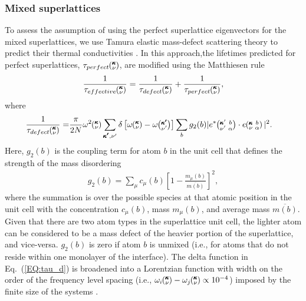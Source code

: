 \subsubsection{Mixed superlattices}
To assess the assumption of using the perfect superlattice eigenvectors for the mixed superlattices, we use Tamura elastic mass-defect scattering theory to predict their thermal conductivities \cite{tamura_isotope_1983}. In this approach,the lifetimes predicted for perfect superlattices, $\tau_{perfect}\mspace{-4.0mu}\left(\mspace{-8.0mu} \begin{smallmatrix}&\pmb{\kappa} \\&\nu\end{smallmatrix} \mspace{-3.0mu}\right)$, are modified using the Matthiesen rule %
\begin{equation}\label{EQ:tau_eff}
\begin{split}
\frac{1}{\tau_{effective}\kv} = \frac{1}{\tau_{defect}\kv}+\frac{1}{\tau_{perfect}\kv} ,
\end{split}
\end{equation}
where
\begin{equation}\label{EQ:tau_d}
\begin{split}
\frac{1}{\tau_{defect}\kv} = &\frac{\pi}{2N}\omega^2\kv \sum_{\pmb{\kappa'},\nu'} \delta\left[ \omega\kv - \omega\kvp \right]
\sum_{b} g_2(b) |e^*\kvbap \cdot e\kvba |^2 .
\end{split}
\end{equation}
Here, $g_2(b)$ is the coupling term for atom $b$ in the unit cell that defines the strength of the mass disordering
\begin{equation}\label{EQ:g(b)}
\begin{split}
g_2(b) = \sum_\mu c_{\mu}(b)\left[1-\frac{m_{\mu}(b)}{\overline{m(b)}}\right]^2, 
\end{split}
\end{equation}
where the summation is over the possible species at that atomic position in the unit cell with the concentration $c_\mu(b)$, mass $m_\mu(b)$, and average mass $\overline{m(b)}$. Given that there are two atom types in the superlattice unit cell, the lighter atom can be considered to be a mass defect of the heavier portion of the superlattice, and vice-versa. $g_2(b)$ is zero if atom $b$ is unmixed (i.e., for atoms that do not reside within one monolayer of the interface). The delta function in Eq.~(\ref{EQ:tau_d}) is broadened into a Lorentzian function with width on the order of the frequency level spacing (i.e., $\omega_i \mspace{-4.0mu}\left(\mspace{-8.0mu} \begin{smallmatrix}&\pmb{\kappa} \\&\nu\end{smallmatrix} \mspace{-3.0mu}\right) -\omega_j \mspace{-4.0mu}\left(\mspace{-8.0mu} \begin{smallmatrix}&\pmb{\kappa} \\&\nu\end{smallmatrix} \mspace{-3.0mu}\right) \propto 10^{-4}$) imposed by the finite size of the systems \cite{allen_thermal_1993}.

